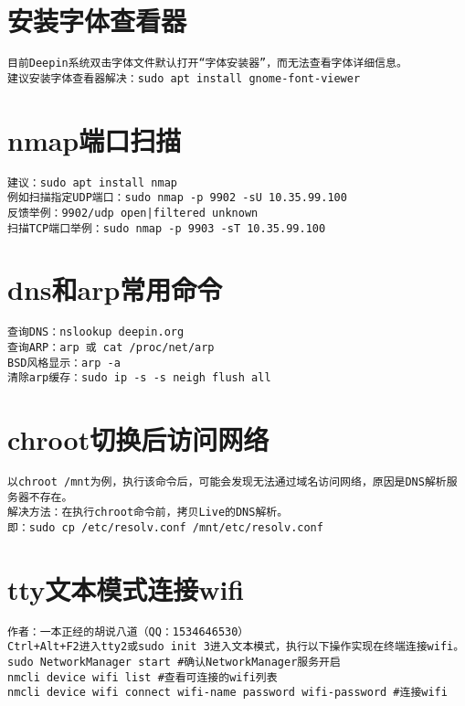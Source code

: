 \documentclass[a4paper,fontset=fandol,zihao=-4,linespread=1.2]{ctexbook}
\begin{document}
\section{安装字体查看器}
\begin{lstlisting}
目前Deepin系统双击字体文件默认打开“字体安装器”，而无法查看字体详细信息。
建议安装字体查看器解决：sudo apt install gnome-font-viewer
\end{lstlisting}

\section{nmap端口扫描}
\begin{lstlisting}
建议：sudo apt install nmap
例如扫描指定UDP端口：sudo nmap -p 9902 -sU 10.35.99.100
反馈举例：9902/udp open|filtered unknown
扫描TCP端口举例：sudo nmap -p 9903 -sT 10.35.99.100
\end{lstlisting}

\section{dns和arp常用命令}
\begin{lstlisting}
查询DNS：nslookup deepin.org
查询ARP：arp 或 cat /proc/net/arp
BSD风格显示：arp -a
清除arp缓存：sudo ip -s -s neigh flush all
\end{lstlisting}

\section{chroot切换后访问网络}
\begin{lstlisting}
以chroot /mnt为例，执行该命令后，可能会发现无法通过域名访问网络，原因是DNS解析服务器不存在。
解决方法：在执行chroot命令前，拷贝Live的DNS解析。
即：sudo cp /etc/resolv.conf /mnt/etc/resolv.conf
\end{lstlisting}

\section{tty文本模式连接wifi}
\begin{lstlisting}
作者：一本正经的胡说八道（QQ：1534646530）
Ctrl+Alt+F2进入tty2或sudo init 3进入文本模式，执行以下操作实现在终端连接wifi。
sudo NetworkManager start #确认NetworkManager服务开启
nmcli device wifi list #查看可连接的wifi列表
nmcli device wifi connect wifi-name password wifi-password #连接wifi
\end{lstlisting}
\end{document}
